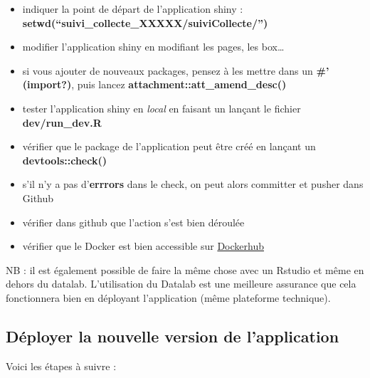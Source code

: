 \documentclass[
  letterpaper,
  DIV=11,
  numbers=noendperiod]{scrreprt}
\providecommand{\tightlist}{%
  \setlength{\itemsep}{0pt}\setlength{\parskip}{0pt}}\usepackage{longtable,booktabs,array}
\begin{document}
\begin{itemize}
\tightlist
\item
  indiquer la point de départ de l'application shiny :
  \textbf{setwd(``suivi\_collecte\_XXXXX/suiviCollecte/'')}\\
\item
  modifier l'application shiny en modifiant les pages, les box\ldots{}\\
\item
  si vous ajouter de nouveaux packages, pensez à les mettre dans un
  \textbf{\#' (\textbf{import?})}, puis lancez
  \textbf{attachment::att\_amend\_desc()}\\
\item
  tester l'application shiny en \emph{local} en faisant un lançant le
  fichier \textbf{dev/run\_dev.R}\\
\item
  vérifier que le package de l'application peut être créé en lançant un
  \textbf{devtools::check()}\\
\item
  s'il n'y a pas d'\textbf{errrors} dans le check, on peut alors
  committer et pusher dans Github\\
\item
  vérifier dans github que l'action s'est bien déroulée\\
\item
  vérifier que le Docker est bien accessible sur
  \href{https://hub.docker.com/}{Dockerhub}
\end{itemize}

NB : il est également possible de faire la même chose avec un Rstudio et
même en dehors du datalab. L'utilisation du Datalab est une meilleure
assurance que cela fonctionnera bien en déployant l'application (même
plateforme technique).

\hypertarget{duxe9ployer-la-nouvelle-version-de-lapplication}{%
\subsection{Déployer la nouvelle version de
l'application}\label{duxe9ployer-la-nouvelle-version-de-lapplication}}

Voici les étapes à suivre :
\end{document}
